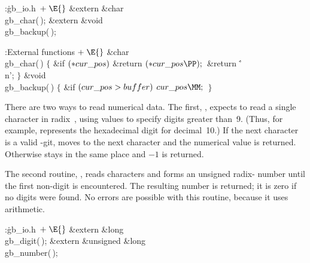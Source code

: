\Y\B\4:\.{gb\_io.h\,}\X${}\mathrel+\E{}$\6
\&{extern} \&{char} \\{gb\_char}(\,);\6
\&{extern} \&{void} \\{gb\_backup}(\,);\par
\fi

\B{}:External functions\X${}\mathrel+\E{}$\6
\1\1\&{char} \\{gb\_char}(\,)\2\2\6
${}\{{}$\1\6
\&{if} ${}({*}\\{cur\_pos}){}$\1\5
\&{return} ${}({*}\\{cur\_pos}\PP);{}$\2\6
\&{return} \.{'\\n'};\6
\4${}\}{}$\2\7
\1\1\&{void} \\{gb\_backup}(\,)\2\2\6
${}\{{}$\1\6
\&{if} ${}(\\{cur\_pos}>\\{buffer}){}$\1\5
${}\\{cur\_pos}\MM;{}$\2\6
\4${}\}{}$\2\par
\fi

There are two ways to read numerical data. The first, ,
expects to read a single character in radix~, using 
values
to specify digits greater than~9. (Thus, for example,  represents
the hexadecimal digit for decimal~10.)
If the next character is a valid -git,
 moves to the next character and the numerical value is
returned.
Otherwise  stays in the same place and $-1$ is returned.

The second routine, , reads characters and forms an
unsigned radix- number until the first non-digit is encountered.
The resulting number is returned; it is zero if no digits were found.
No errors are possible with this routine, because it uses
 arithmetic.

\Y\B\4:\.{gb\_io.h\,}\X${}\mathrel+\E{}$\6
\&{extern} \&{long} \\{gb\_digit}(\,);\6
\&{extern} \&{unsigned} \&{long} \\{gb\_number}(\,);\par
\fi

